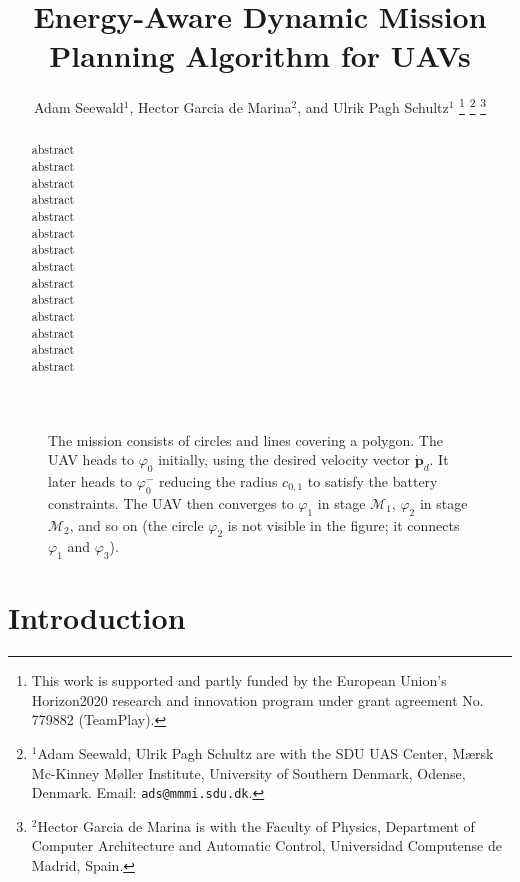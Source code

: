 \documentclass[letterpaper,10pt,conference]{ieeeconf}
\title{\LARGE \bf
Energy-Aware Dynamic Mission Planning Algorithm for UAVs
}
\author{
  Adam Seewald$^{1}$, Hector Garcia de Marina$^{2}$, and Ulrik Pagh Schultz$^{1}$
  \thanks{This work is supported and partly funded by the European Union's Horizon2020 research and innovation program under grant agreement No. 779882 (TeamPlay).
  }
  \thanks{$^{1}$Adam Seewald, Ulrik Pagh Schultz are with the SDU UAS Center, M{\ae}rsk Mc-Kinney M{\o}ller Institute, University of Southern Denmark, Odense, Denmark. Email: {\tt\small ads@mmmi.sdu.dk}.}
  \thanks{$^{2}$Hector Garcia de Marina is with the Faculty of Physics, Department of Computer Architecture and Automatic Control, Universidad Computense de Madrid, Spain.}
}
\newcommand{\figpath}{./figures}
\theoremstyle{definition}
\begin{document}
\maketitle

\thispagestyle{empty}
\pagestyle{empty}

\begin{abstract}

  abstract\\
  abstract\\
  abstract\\
  abstract\\
  abstract\\
  abstract\\
  abstract\\
  abstract\\
  abstract\\
  abstract\\
  abstract\\
  abstract\\
  abstract\\
  abstract
\end{abstract}

%
\IEEEpeerreviewmaketitle


\begin{figure*}[t]
  \centering
  
  \caption{The mission consists of circles and lines covering a polygon. The UAV heads to $\varphi_0$ initially, using the desired velocity vector $\dot{\mathbf{p}}_d$. It later heads to $\varphi_0^-$ reducing the radius $c_{0,1}$ to satisfy the battery constraints. The UAV then converges to $\varphi_1$ in stage $\mathcal{M}_1$, $\varphi_2$ in stage $\mathcal{M}_2$, and so on (the circle $\varphi_2$ is not visible in the figure; it connects $\varphi_1$ and $\varphi_3$).}
  \label{fig:overview}
\end{figure*}

\section{Introduction}
\label{sec:intro}
\end{document}

